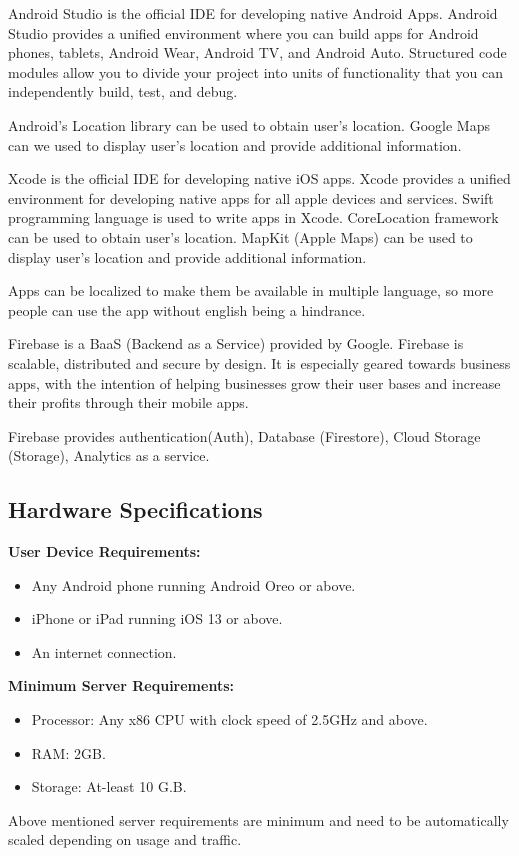 \documentclass[../Report.tex]{subfiles}
\begin{document}
\begin{description}
  \item[Android Studio:] Android Studio\cite{android} is the official IDE for developing native Android Apps. Android Studio provides a unified  
  environment where you can build apps for Android phones, tablets, Android Wear, Android TV, and Android Auto. Structured code modules 
  allow you to  divide your project into units of functionality that you can independently build, test, and debug.\par
  Android's Location library can be used to obtain user's location. Google Maps can we used to display user's location and provide 
  additional information.

  \item[Xcode:] Xcode\cite{ios} is the official IDE for developing native iOS apps. Xcode provides a unified environment for developing native apps 
  for all apple devices and services. Swift programming language is used to write apps in Xcode. CoreLocation framework can be used to 
  obtain user's location. MapKit (Apple Maps) can be used to display user's location and provide additional information.\par

  \item Apps can be localized to make them be available in multiple language, so more people can use the app without english being a 
  hindrance.

  \item[Firebase:] Firebase\cite{firebase} is a BaaS (Backend as a Service) provided by Google. Firebase is scalable, distributed and secure by design. It is especially
  geared towards business apps, with the intention of helping businesses grow their user bases and increase their profits through their mobile apps.\par
  Firebase provides authentication(Auth), Database (Firestore), Cloud Storage (Storage), Analytics as a service.
\end{description}

\clearpage
\subsection{Hardware Specifications}

\noindent\textbf{User Device Requirements:}
\begin{itemize}
  \item Any Android phone running Android Oreo or above.
  \item iPhone or iPad running iOS 13 or above.
  \item An internet connection.
\end{itemize}

\noindent\textbf{Minimum Server Requirements:}
\begin{itemize}
  \item Processor: Any x86 CPU with clock speed of 2.5GHz and above.
  \item RAM: 2GB.
  \item Storage: At-least 10 G.B.
\end{itemize}
Above mentioned server requirements are minimum and need to be automatically scaled depending on usage and traffic.
\end{document}
